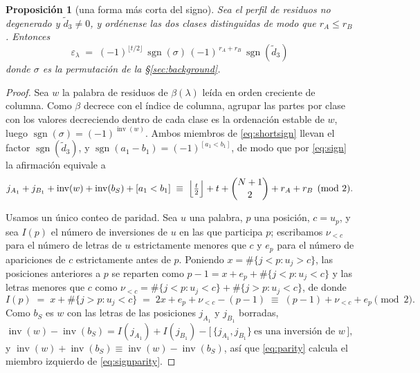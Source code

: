 \documentclass[11pt,reqno]{amsart}
\theoremstyle{plain}
\newtheorem{proposition}[theorem]{Proposición}
\theoremstyle{definition}
\newcommand{\inv}{\operatorname{inv}}
\newcommand{\sgn}{\operatorname{sgn}}
\begin{document}
\begin{proposition}[una forma más corta del signo]\label{rem:sign}
Sea el perfil de residuos no degenerado y $\tilde d_3\ne0$, y ordénense las dos clases
distinguidas de modo que $r_A\le r_B$. Entonces
\begin{equation}\label{eq:shortsign}
\boxed{\;\;\varepsilon_\lambda\;=\;(-1)^{\lfloor t/2\rfloor}\,\sgn(\sigma)\,(-1)^{\,r_A+r_B}\,
\sgn(\tilde d_3)\;\;}
\end{equation}
donde $\sigma$ es la permutación de la \S\ref{sec:background}.
\end{proposition}

\begin{proof}
Sea $w$ la palabra de residuos de $\beta(\lambda)$ leída en orden creciente de columna. Como $\beta$
decrece con el índice de columna, agrupar las partes por clase con los valores decreciendo dentro de
cada clase es la ordenación estable de $w$, luego $\sgn(\sigma)=(-1)^{\inv(w)}$. Ambos miembros de
\eqref{eq:shortsign} llevan el factor $\sgn(\tilde d_3)$, y $\sgn(a_1-b_1)=(-1)^{[a_1<b_1]}$,
de modo que por \eqref{eq:sign} la afirmación equivale a
\begin{equation}\label{eq:signparity}
j_{A_1}+j_{B_1}+\inv(w)+\inv(b_S)+[a_1<b_1]\;\equiv\;
\Bigl\lfloor\tfrac t2\Bigr\rfloor+t+\binom{N+1}{2}+r_A+r_B \pmod 2 .
\end{equation}

Usamos un único conteo de paridad. Sea $u$ una palabra, $p$ una posición, $c=u_p$, y sea $I(p)$ el
número de inversiones de $u$ en las que participa $p$; escribamos $\nu_{<c}$ para el número de letras
de $u$ estrictamente menores que $c$ y $e_p$ para el número de apariciones de $c$ estrictamente antes
de $p$. Poniendo $x=\#\{j<p:u_j>c\}$, las posiciones anteriores a $p$ se reparten como
$p-1=x+e_p+\#\{j<p:u_j<c\}$ y las letras menores que $c$ como
$\nu_{<c}=\#\{j<p:u_j<c\}+\#\{j>p:u_j<c\}$, de donde
\begin{equation}\label{eq:parity}
I(p)\;=\;x+\#\{j>p:u_j<c\}\;=\;2x+e_p+\nu_{<c}-(p-1)\;\equiv\;(p-1)+\nu_{<c}+e_p \pmod 2 .
\end{equation}
Como $b_S$ es $w$ con las letras de las posiciones $j_{A_1}$ y $j_{B_1}$ borradas,
\[
\inv(w)-\inv(b_S)=I(j_{A_1})+I(j_{B_1})
-\bigl[\,\{j_{A_1},j_{B_1}\}\ \text{es una inversión de }w\,\bigr],
\]
y $\inv(w)+\inv(b_S)\equiv\inv(w)-\inv(b_S)$, así que \eqref{eq:parity} calcula el miembro izquierdo
de \eqref{eq:signparity}.


\end{proof}
\end{document}
